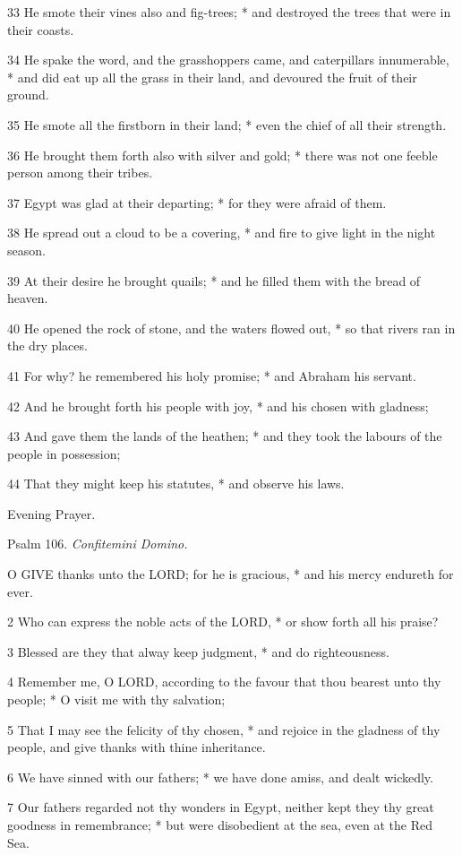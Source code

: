 33 He smote their vines also and fig-trees; * and destroyed
the trees that were in their coasts.

34 He spake the word, and the grasshoppers came, and
caterpillars innumerable, * and did eat up all the grass in their land,
and devoured the fruit of their ground.

35 He smote all the firstborn in their land; * even
the chief of all their strength.

36 He brought them forth also with silver and gold;
* there was not one feeble person among their tribes.

37 Egypt was glad at their departing; * for they were
afraid of them.

38 He spread out a cloud to be a covering, * and fire
to give light in the night season.

39 At their desire he brought quails; * and he filled
them with the bread of heaven.

40 He opened the rock of stone, and the waters flowed
out, * so that rivers ran in the dry places.

41 For why? he remembered his holy promise; * and Abraham
his servant.

42 And he brought forth his people with joy, * and
his chosen with gladness;

43 And gave them the lands of the heathen; * and they
took the labours of the people in possession;

44 That they might keep his statutes, * and observe
his laws. 

Evening
Prayer.

Psalm
106. \emph{Confitemini Domino.}

O
GIVE thanks unto the LORD; for he is gracious, * and his mercy endureth
for ever.

2 Who can express the noble acts of the LORD, * or show forth
all his praise?

3 Blessed are they that alway keep judgment, * and
do righteousness.

4 Remember me, O LORD, according to the favour that
thou bearest unto thy people; * O visit me with thy salvation;

5 That I may see the felicity of thy chosen, * and
rejoice in the gladness of thy people, and give thanks with thine inheritance.

6 We have sinned with our fathers; * we have done amiss,
and dealt wickedly.

7 Our fathers regarded not thy wonders in Egypt, neither
kept they thy great goodness in remembrance; * but were disobedient at
the sea, even at the Red Sea.

